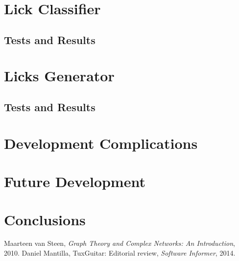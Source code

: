 \documentclass{llncs}
\begin{document}
\section{Lick Classifier}
\subsection{Tests and Results}

\section{Licks Generator}
\subsection{Tests and Results}

\section{Development Complications}

\section{Future Development}


\section{Conclusions}

\begin{thebibliography}{50}
		Maarteen van Steen, 
		\textsl{Graph Theory and Complex Networks: An Introduction}, 
		2010.
		Daniel Mantilla,
		TuxGuitar: Editorial review,
		\textsl{Software Informer},
		2014.
\end{thebibliography}
\end{document}
